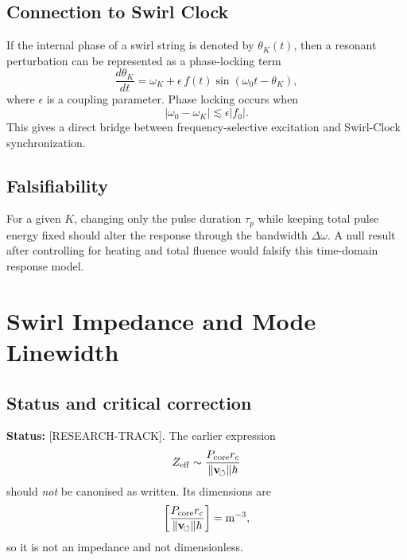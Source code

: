     \subsection*{Connection to Swirl Clock}
        
        If the internal phase of a swirl string is denoted by \(\theta_K(t)\), then a resonant perturbation can be represented as a phase-locking term
        \begin{equation}
            \frac{d\theta_K}{dt}
            =
            \omega_K
            +
            \epsilon\,f(t)\sin(\omega_0 t-\theta_K),
            \label{eq:phase_locking_response}
        \end{equation}
        where \(\epsilon\) is a coupling parameter. Phase locking occurs when
        \begin{equation}
            |\omega_0-\omega_K| \lesssim \epsilon |f_0|.
            \label{eq:locking_condition}
        \end{equation}
        This gives a direct bridge between frequency-selective excitation and Swirl-Clock synchronization.
    
    \subsection*{Falsifiability}
        
        For a given \(K\), changing only the pulse duration \(\tau_p\) while keeping total pulse energy fixed should alter the response through the bandwidth \(\Delta\omega\). A null result after controlling for heating and total fluence would falsify this time-domain response model.

\section{Swirl Impedance and Mode Linewidth}
    \label{app:swirl-impedance-linewidth}
    
    \subsection*{Status and critical correction}
        
        \noindent
        \textbf{Status:} [RESEARCH-TRACK].
        The earlier expression
        \[
            Z_{\mathrm{eff}} \sim \frac{P_{\mathrm{core}}r_c}{\lVert\mathbf{v}_{\!\boldsymbol{\circlearrowleft}}\rVert\hbar}
        \]
        should \emph{not} be canonised as written. Its dimensions are
        \[
            \left[
                \frac{P_{\mathrm{core}}r_c}{\lVert\mathbf{v}_{\!\boldsymbol{\circlearrowleft}}\rVert\hbar}
            \right]
            =
            \mathrm{m^{-3}},
        \]
        so it is not an impedance and not dimensionless.
        
